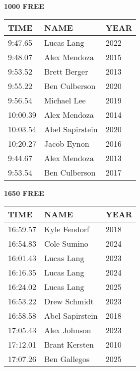 \begin{table}[H]
\centering
\begin{minipage}[t]{0.48\textwidth}
\centering
\textbf{1000 FREE}\\[0.1cm]
\begin{tabular}{@{}p{1.8cm}p{2.8cm}p{1.2cm}@{}}
\hline
    \textbf{TIME} & \textbf{NAME} & \textbf{YEAR} \\
\hline
    9:47.65 & Lucas Lang & 2022 \\
    9:48.07 & Alex Mendoza & 2015 \\
    9:53.52 & Brett Berger & 2013 \\
    9:55.22 & Ben Culberson & 2020 \\
    9:56.54 & Michael Lee & 2019 \\
    10:00.39 & Alex Mendoza & 2014 \\
    10:03.54 & Abel Sapirstein & 2020 \\
    10:20.27 & Jacob Eynon & 2016 \\
    9:44.67 & Alex Mendoza & 2013 \\
    9:53.54 & Ben Culberson & 2017 \\
\hline
\end{tabular}
\end{minipage}\hfill
\begin{minipage}[t]{0.48\textwidth}
\centering
\textbf{1650 FREE}\\[0.1cm]
\begin{tabular}{@{}p{1.8cm}p{2.8cm}p{1.2cm}@{}}
\hline
    \textbf{TIME} & \textbf{NAME} & \textbf{YEAR} \\
\hline
    16:59.57 & Kyle Fendorf & 2018 \\
    16:54.83 & Cole Sumino & 2024 \\
    16:01.43 & Lucas Lang & 2023 \\
    16:16.35 & Lucas Lang & 2024 \\
    16:24.02 & Lucas Lang & 2025 \\
    16:53.22 & Drew Schmidt & 2023 \\
    16:58.58 & Abel Sapirstein & 2018 \\
    17:05.43 & Alex Johnson & 2023 \\
    17:12.01 & Brant Kersten & 2010 \\
    17:07.26 & Ben Gallegos & 2025 \\
\hline
\end{tabular}
\end{minipage}
\end{table}

